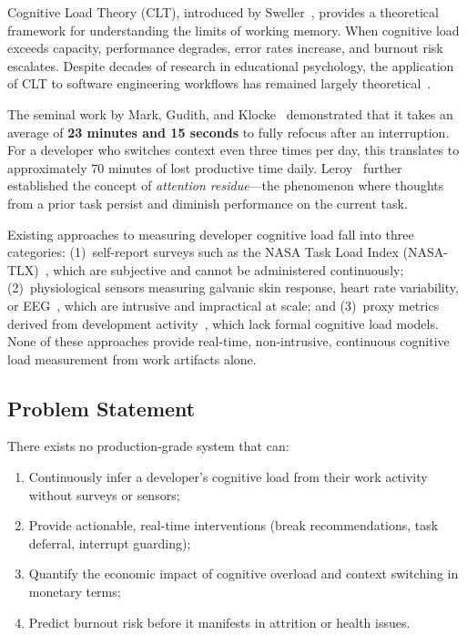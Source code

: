 \documentclass[12pt]{article}
\begin{document}
Cognitive Load Theory (CLT), introduced by Sweller~\cite{sweller1988cognitive}, provides a theoretical framework for understanding the limits of working memory. When cognitive load exceeds capacity, performance degrades, error rates increase, and burnout risk escalates. Despite decades of research in educational psychology, the application of CLT to software engineering workflows has remained largely theoretical~\cite{sweller2019cognitive}.

The seminal work by Mark, Gudith, and Klocke~\cite{mark2008cost} demonstrated that it takes an average of \textbf{23 minutes and 15 seconds} to fully refocus after an interruption. For a developer who switches context even three times per day, this translates to approximately 70 minutes of lost productive time daily. Leroy~\cite{leroy2009why} further established the concept of \emph{attention residue}---the phenomenon where thoughts from a prior task persist and diminish performance on the current task.

Existing approaches to measuring developer cognitive load fall into three categories: (1)~self-report surveys such as the NASA Task Load Index (NASA-TLX)~\cite{hart1988development}, which are subjective and cannot be administered continuously; (2)~physiological sensors measuring galvanic skin response, heart rate variability, or EEG~\cite{fritz2014developers, muller2015stuck}, which are intrusive and impractical at scale; and (3)~proxy metrics derived from development activity~\cite{meyer2019today}, which lack formal cognitive load models. None of these approaches provide real-time, non-intrusive, continuous cognitive load measurement from work artifacts alone.

\subsection{Problem Statement}

There exists no production-grade system that can:
\begin{enumerate}[noitemsep]
    \item Continuously infer a developer's cognitive load from their work activity without surveys or sensors;
    \item Provide actionable, real-time interventions (break recommendations, task deferral, interrupt guarding);
    \item Quantify the economic impact of cognitive overload and context switching in monetary terms;
    \item Predict burnout risk before it manifests in attrition or health issues.
\end{enumerate}
\end{document}
